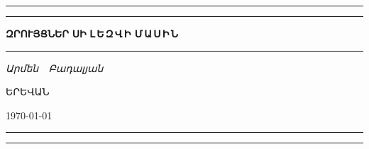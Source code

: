
\begin{titlepage}
\begingroup
\newlength\drop{}\textheight

\setlength{\parindent}{0pt}

\rule{\textwidth}{1pt}\par
\vspace{2pt}\vspace{-\baselineskip}
\rule{\textwidth}{0.4pt}\par

\vspace\drop
\centering

{\fontsize{42}{42}\selectfont\textbf{Զ\;Ր\;ՈՒ\;Յ\;Ց\;Ն\;Ե\;Ր}}
\null\vskip12pt\null
{\fontsize{64}{64}\selectfont\textbf{Ս\;Ի}}
\null\vskip12pt\null
{\fontsize{32}{32}\selectfont\textbf{Լ\,Ե\,Զ\,Վ\,Ի\; Մ\,Ա\,Ս\,Ի\,Ն}}

\vspace{0.25\drop}
\rule{0.3\textwidth}{0.4pt}\par
\vspace{\drop}

{\Large \textit{Արմեն~~Բադալյան}}


\vfill

{\large ԵՐԵՎԱՆ}

{\large\today}

\rule{\textwidth}{0.4pt}\par
\vspace{2pt}\vspace{-\baselineskip}
\rule{\textwidth}{1pt}\par

\endgroup

\end{titlepage}

\begin{titlepage}
\null
\end{titlepage}
